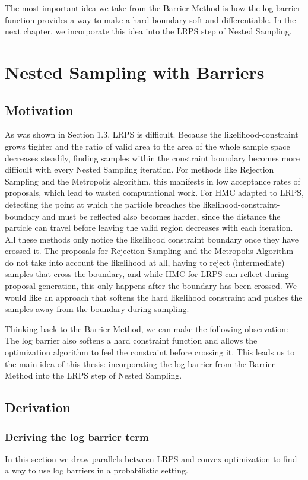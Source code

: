 \documentclass[12pt, a4paper]{report}
\begin{document}
The most important idea we take from the Barrier Method is how the log barrier function provides a way to make a hard boundary soft and differentiable.
In the next chapter, we incorporate this idea into the LRPS step of Nested Sampling.




\chapter{Nested Sampling with Barriers}

\section{Motivation}
As was shown in Section 1.3, LRPS is difficult.
Because the likelihood-constraint grows tighter and the ratio of valid area to the area of the whole sample space decreases steadily, finding samples within the constraint boundary becomes more difficult with every Nested Sampling iteration.
For methods like Rejection Sampling and the Metropolis algorithm, this manifests in low acceptance rates of proposals, which lead to wasted computational work.
For HMC adapted to LRPS, detecting the point at which the particle breaches the likelihood-constraint-boundary and must be reflected also becomes harder, since the distance the particle can travel before leaving the valid region decreases with each iteration.
All these methods only notice the likelihood constraint boundary once they have crossed it.
The proposals for Rejection Sampling and the Metropolis Algorithm do not take into account the likelihood at all, having to reject (intermediate) samples that cross the boundary, and while HMC for LRPS can reflect during proposal generation, this only happens after the boundary has been crossed.
We would like an approach that softens the hard likelihood constraint and pushes the samples away from the boundary during sampling.

Thinking back to the Barrier Method, we can make the following observation:
The log barrier also softens a hard constraint function and allows the optimization algorithm to feel the constraint before crossing it.
This leads us to the main idea of this thesis: incorporating the log barrier from the Barrier Method into the LRPS step of Nested Sampling.

\section{Derivation}
\subsection{Deriving the log barrier term}
In this section we draw parallels between LRPS and convex optimization to find a way to use log barriers in a probabilistic setting.
\end{document}
